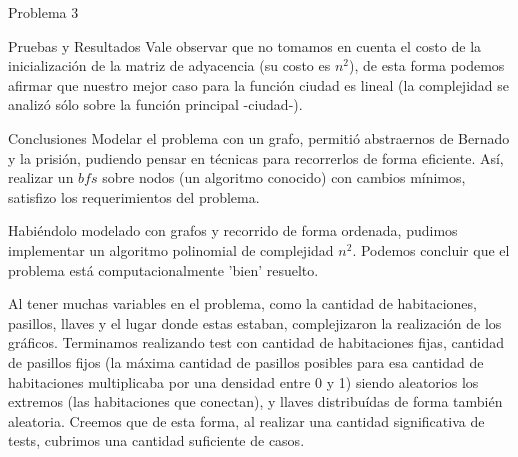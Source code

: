 \begin{section}{Problema 3}
\begin{subsection}{Pruebas y Resultados}
		Vale observar que no tomamos en cuenta el costo de la inicialización de la matriz de adyacencia (su costo es $n^2$), de esta forma podemos afirmar que nuestro mejor caso para la función ciudad es lineal (la complejidad se analizó sólo sobre la función principal -ciudad-).

		
	\end{subsection}

	\begin{subsection}{Conclusiones}
		Modelar el problema con un grafo, permitió abstraernos de Bernado y la prisión, pudiendo pensar en técnicas para recorrerlos de forma eficiente. Así, realizar un $bfs$ sobre nodos (un algoritmo conocido) con cambios mínimos, satisfizo los requerimientos del problema.

		Habiéndolo modelado con grafos y recorrido de forma ordenada, pudimos implementar un algoritmo polinomial de complejidad $n^2$. Podemos concluir que el problema está computacionalmente 'bien' resuelto.

		Al tener muchas variables en el problema, como la cantidad de habitaciones, pasillos, llaves y el lugar donde estas estaban, complejizaron la realización de los gráficos. Terminamos realizando test con cantidad de habitaciones fijas, cantidad de pasillos fijos (la máxima cantidad de pasillos posibles para esa cantidad de habitaciones multiplicaba por una densidad entre 0 y 1) siendo aleatorios los extremos (las habitaciones que conectan), y llaves distribuídas de forma también aleatoria. Creemos que de esta forma, al realizar una cantidad significativa de tests, cubrimos una cantidad suficiente de casos.

	\end{subsection}
\end{section}


